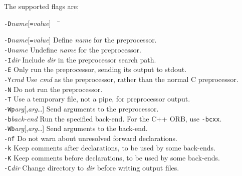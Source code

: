 \documentclass[11pt,twoside,a4paper]{article}
\newcommand{\cmdline}[1]{\texttt{#1}}
\begin{document}
The supported flags are:

\begin{tabbing}
\cmdline{-D}\textit{name}[\cmdline{=}\textit{value}]~~ \= \kill

\cmdline{-D}\textit{name}[\cmdline{=}\textit{value}]
     \> Define \textit{name} for the preprocessor.\\

\cmdline{-U}\textit{name}
     \> Undefine \textit{name} for the preprocessor.\\

\cmdline{-I}\textit{dir}
     \> Include \textit{dir} in the preprocessor search path.\\

\cmdline{-E}
     \> Only run the preprocessor, sending its output to stdout.\\

\cmdline{-Y}\textit{cmd}
     \> Use \textit{cmd} as the preprocessor, rather than the normal C
        preprocessor.\\

\cmdline{-N}
     \> Do not run the preprocessor.\\

\cmdline{-T}
     \> Use a temporary file, not a pipe, for preprocessor output.\\

\cmdline{-Wp}\textit{arg}[,\textit{arg}\dots]
     \> Send arguments to the preprocessor.\\

\cmdline{-b}\textit{back-end}
     \> Run the specified back-end. For the C++ ORB, use \cmdline{-bcxx}.\\

\cmdline{-Wb}\textit{arg}[,\textit{arg}\dots]
     \> Send arguments to the back-end.\\

\cmdline{-nf}
     \> Do not warn about unresolved forward declarations.\\

\cmdline{-k}
     \> Keep comments after declarations, to be used by some back-ends.\\

\cmdline{-K}
     \> Keep comments before declarations, to be used by some back-ends.\\

\cmdline{-C}\textit{dir}
     \> Change directory to \textit{dir} before writing output files.\\


\end{tabbing}
\end{document}
